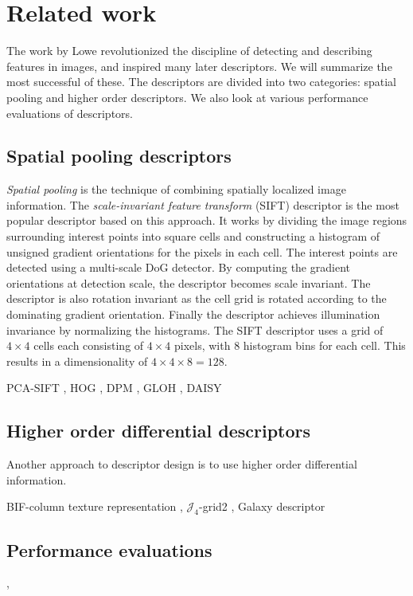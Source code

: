 \documentclass[../thesis.tex]{subfiles}
\begin{document}
\section{Related work}

The work by Lowe \cite{lowe2004distinctive} revolutionized the discipline of detecting and describing features in images, and inspired many later descriptors. We will summarize the most successful of these. The descriptors are divided into two categories: spatial pooling and higher order descriptors. We also look at various performance evaluations of descriptors.

\subsection{Spatial pooling descriptors}

\emph{Spatial pooling} is the technique of combining spatially localized image information. The \emph{scale-invariant feature transform} (SIFT) descriptor \cite{lowe2004distinctive} is the most popular descriptor based on this approach. It works by dividing the image regions surrounding interest points into square cells and constructing a histogram of unsigned gradient orientations for the pixels in each cell. The interest points are detected using a multi-scale DoG detector. By computing the gradient orientations at detection scale, the descriptor becomes scale invariant. The descriptor is also rotation invariant as the cell grid is rotated according to the dominating gradient orientation. Finally the descriptor achieves illumination invariance by normalizing the histograms. The SIFT descriptor uses a grid of $4 \times 4$ cells each consisting of $4 \times 4$ pixels, with 8 histogram bins for each cell. This results in a dimensionality of $4 \times 4 \times 8 = 128$.

PCA-SIFT \cite{ke2004pca},
HOG \cite{dalal2005histograms},
DPM \cite{felzenszwalb2008discriminatively},
GLOH \cite{mikolajczyk2005performance},
DAISY \cite{tola2008fast,winder2009picking}

\subsection{Higher order differential descriptors}

Another approach to descriptor design is to use higher order differential information.

BIF-column texture representation \cite{crosier2010using},
$\mathcal{J}_4$-grid2 \cite{larsen2012jet},
Galaxy descriptor \cite{pedersen2013shape}

\subsection{Performance evaluations}

\cite{mikolajczyk2005performance},
\cite{dahl2011finding}

\subbibliography
\end{document}
